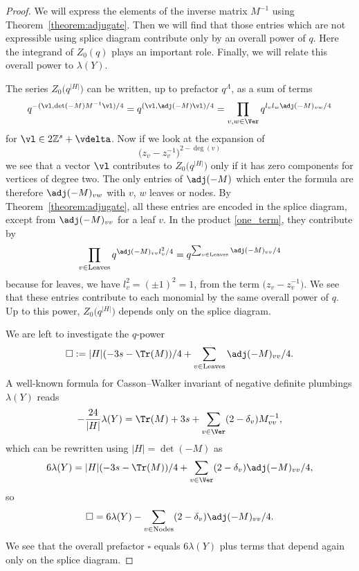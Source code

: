 \documentclass[10pt,a4paper]{amsart}
\begin{document}
\begin{proof}
	We will express the elements of the inverse matrix $M^{-1}$ using Theorem~\ref{theorem:adjugate}. Then we will find that those entries which are not expressible using splice diagram contribute only by an overall power of $q$. Here the integrand of $Z_0(q)$ plays an important role. Finally, we will relate this overall power to $\lambda(Y)$.
	
	The series $Z_0\bigl(q^{|H|}\bigr)$ can be written, up to prefactor $q^\Lambda$, as a sum of terms
	\begin{equation}\label{one_term}
		q^{-(\vl, \det(-M) M^{-1}\vl)/4} = q^{(\vl, \adj(-M)\vl)/4} = \prod_{v, w \in \Ver} q^{l_v l_w\adj(-M)_{vw}/4}
	\end{equation}
 for $\vl \in 2\mathbb{Z}^s+\vdelta$. Now if we look at the expansion of
	\begin{equation}
		\bigl( z_v - z_v^{-1}\bigr)^{2-\deg(v)}
	\end{equation}
	we see that a vector $\vl$ contributes to $Z_0\bigl(q^{|H|}\bigr)$ only if it has zero components for vertices of degree two. The only entries of $\adj(-M)$ which enter the formula are therefore $\adj(-M)_{vw}$ with $v$, $w$ leaves or nodes. By Theorem~\ref{theorem:adjugate}, all these entries are encoded in the splice diagram, except from $\adj(-M)_{vv}$ for a leaf $v$. In the product \eqref{one_term}, they contribute by
	\begin{equation}\label{one_term_power}
		\prod_{v \in \text{Leaves}} q^{\adj(-M)_{vv} l^2_v/4} = q^{\sum_{v \in \text{Leaves}} \adj(-M)_{vv}/4}
	\end{equation}
	because for leaves, we have $l_v^2 = (\pm 1)^2 = 1$, from the term $\bigl(z_v-z_v^{-1}\bigr)$. We see that these entries contribute to each monomial by the same overall power of $q$. Up to this power, $Z_0\bigl(q^{|H|}\bigr)$ depends only on the splice diagram.

	We are left to investigate the $q$-power
	\[
		\square := |H|(-3s-\Tr(M))/4 +\sum_{v \in \text{Leaves}} \adj(-M)_{vv}/4.
	\]
	A well-known formula for Casson--Walker invariant of negative definite plumbings $\lambda(Y)$ reads~\cite[p.\ 296]{NeNi02}
	\begin{equation}\label{eq:casson_formula}
		-\frac{24}{|H|}\lambda(Y) = \Tr(M) + 3s + \sum_{v \in \Ver} (2-\delta_v) M^{-1}_{vv},
	\end{equation}
 which can be rewritten using $|H|=\det(-M)$ as
 \begin{equation}\label{eq:casson_formula_adj}
		6\lambda(Y) = |H|(-3s-\Tr(M))/4 + \sum_{v \in \Ver} (2-\delta_v) \adj(-M)_{vv}/4,
	\end{equation}
	so
	\[
	\square = 6\lambda(Y) - \sum_{v \in \text{Nodes}} (2-\delta_v) \adj(-M)_{vv}/4.
	\]
	We see that the overall prefactor $\square$ equals $6\lambda(Y)$ plus terms that depend again only on the splice diagram.
\end{proof}
\end{document}

